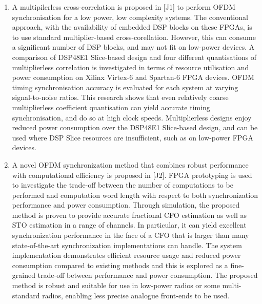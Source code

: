 \begin{enumerate}
\item A multipilerless cross-correlation is proposed in [J1] to perform OFDM synchronisation for a low power, low complexity systems.
The conventional approach, with the availability of embedded DSP blocks on these FPGAs, is to use standard multiplier-based cross-corellation. However, this can consume a significant number of DSP blocks, and may not fit on low-power devices. 
A comparison of DSP48E1 Slice-based design and four different quantisations of multiplierless correlation is investigated in terms of resource utilisation and power consumption on Xilinx Virtex-6 and Spartan-6 FPGA devices. 
OFDM timing synchronisation accuracy is evaluated for each system at varying signal-to-noise ratios. This research shows that even relatively coarse multiplierless coefficient quantisation can yield accurate timing synchronisation, and do so at high clock speeds. 
Multiplierless designs enjoy reduced power consumption over the DSP48E1 Slice-based design, and can be used where DSP Slice resources are insufficient, such as on low-power FPGA devices.

\item A novel OFDM synchronization method that combines robust performance with computational efficiency is proposed in [J2]. 
FPGA prototyping is used to investigate the trade-off between the number of computations to be performed and computation word length with respect to both synchronization performance and power consumption.
Through simulation, the proposed method is proven to provide accurate fractional CFO estimation as well as STO estimation in a range of channels. 
In particular, it can yield excellent synchronization performance in the face of a CFO that is larger than many state-of-the-art synchronization implementations can handle. 
The system implementation demonstrates efficient resource usage and reduced power consumption compared to existing methods and this is explored as a fine-grained trade-off between performance and power consumption.
The proposed method is robust and suitable for use in low-power radios or some multi-standard radios, enabling less precise analogue front-ends to be used.


\end{enumerate}

